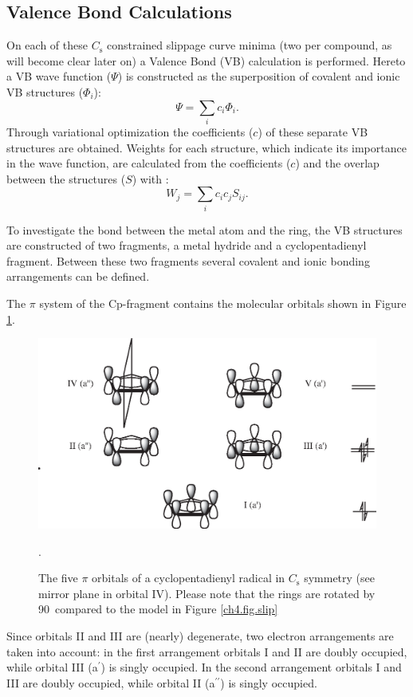 \subsection{Valence Bond Calculations}

On each of these $C_\mathrm{s}$ constrained slippage curve minima (two per compound, as will become clear later on) a Valence Bond (VB) calculation is performed. Hereto a VB wave function ($\Psi$) is constructed as the superposition of covalent and ionic VB structures ($\Phi_i$):
\begin{equation}
\Psi = \sum_{i} c_{i}\Phi{_i}.
\label{ch4.eq.psi}
\end{equation}
Through variational optimization the coefficients ($c$) of these separate VB structures are obtained.
Weights for each structure, which indicate its importance in the wave function, are calculated from the coefficients ($c$) and the overlap between the structures ($S$) with \cite{coulson}:
\begin{equation}
W_{j}=\sum_{i} c_{i}c_{j}S_{ij}.
\label{ch4.eq.weight}
\end{equation}

To investigate the bond between the metal atom and the ring, the VB structures are constructed of two fragments, a metal hydride and a cyclopentadienyl fragment.  Between these two fragments several covalent and ionic bonding arrangements can be defined.

The $\pi$ system of the Cp-fragment contains the molecular orbitals shown in Figure \ref{ch4.fig.cporbs}.
\begin{figure}[htbp]
\center
\includegraphics[scale=0.7]{cyclopentadienyl/figures/cp-orbitals.eps}
\caption{The five $\pi$ orbitals of a cyclopentadienyl radical in $C_\mathrm{s}$ symmetry (see mirror plane in orbital IV). Please note that the rings are rotated by 90\degrees\ compared to the model in Figure \ref{ch4.fig.slip}}.
\label{ch4.fig.cporbs}
\end{figure}
Since orbitals II and III are (nearly) degenerate, two electron arrangements are taken into account: in the first arrangement orbitals I and II are doubly occupied, while orbital III (a$^\prime$) is singly occupied. In the second arrangement orbitals I and III are doubly occupied, while orbital II (a$^{\prime\prime}$) is singly occupied. 


